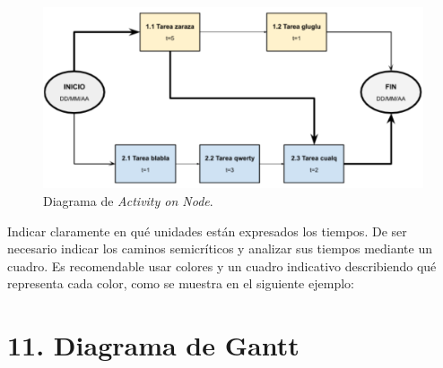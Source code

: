 \documentclass[
11pt, %
]{charter}
\begin{document}
\begin{figure}[htpb]
\centering 
\includegraphics[width=.8\textwidth]{./Figuras/AoN.png}
\caption{Diagrama de \textit{Activity on Node}.}
\label{fig:AoN}
\end{figure}

Indicar claramente en qué unidades están expresados los tiempos.
De ser necesario indicar los caminos semicríticos y analizar sus tiempos mediante un cuadro.
Es recomendable usar colores y un cuadro indicativo describiendo qué representa cada color, como se muestra en el siguiente ejemplo:



\section{11. Diagrama de Gantt}
\label{sec:gantt}
\end{document}
